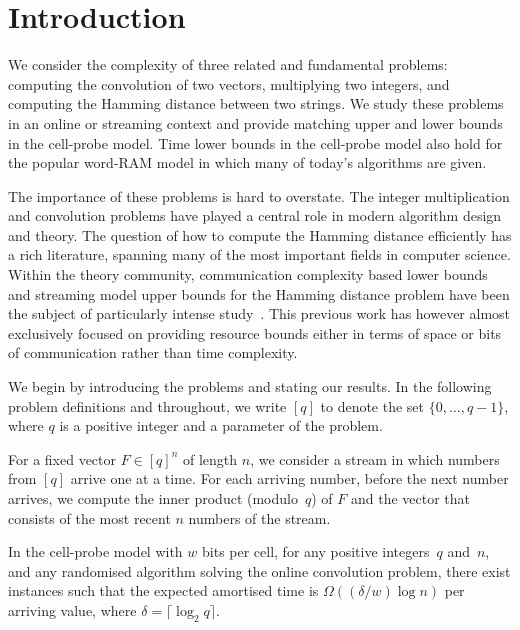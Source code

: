 \documentclass{toc}
\begin{document}
\section{Introduction}


We consider the complexity of three related and fundamental problems: computing the convolution of two vectors, multiplying two integers, and computing the Hamming distance between two strings. We study these problems in an online or streaming context and provide matching upper and lower bounds in the cell-probe model.
Time lower bounds in the cell-probe model also hold for the popular word-RAM model in which many of today's algorithms are given. 

The importance of these problems is hard to overstate. The integer multiplication and convolution problems have played a central role in modern
%
algorithm
design and theory.  The question of how to compute the Hamming distance efficiently has a rich literature, spanning many of the most important fields in computer science. Within the theory community, communication complexity based lower bounds and streaming model upper bounds for the Hamming distance problem have been the subject of particularly intense study~\cite{CDIM:03,Woodruff:04,HSZZ:06,JKS:08,BCRT:10,Chakrabarti:11}. This previous work has however almost exclusively focused on providing resource bounds either in terms of space or bits of communication rather than time complexity.


We begin by introducing the problems and stating our results. In the following problem definitions and throughout, we write $[q]$ to denote the set $\{0,\dots,q-1\}$, where $q$ is a positive integer and a parameter of the problem.

\begin{problem}
  For a fixed vector $F\in[q]^n$ of length $n$, we consider a stream in which numbers from $[q]$ arrive one at a time. For each arriving number, before the next number arrives, we
%
compute  %
the inner product (modulo~$q$) of $F$ and the vector that consists of the most recent  $n$ numbers of the stream.
\end{problem}

%

\begin{theorem}
	\label{thm:conv}
	In the cell-probe model with $w$ bits per cell, for any positive integers~$q$ and~$n$, and any randomised algorithm solving the online convolution problem, there exist instances such that the expected amortised time is  $\Omega{(({\delta}/{w})\log n)}$ per arriving value, where $\delta=\lceil \log_{2}{q} \rceil$.
\end{theorem}
\end{document}

